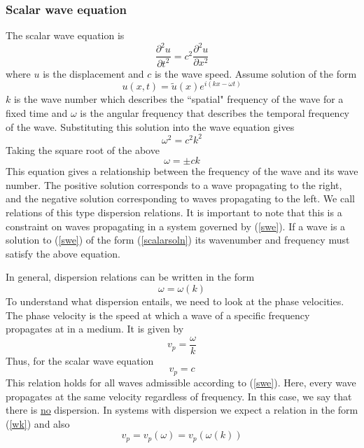 \documentclass{article}
\begin{document}
\subsubsection{Scalar wave equation}
The scalar wave equation is 
\begin{equation} \label{swe}
\frac{\partial^2 u}{\partial t^2} = c^2 \frac{\partial^2 u}{\partial x^2}
\end{equation}
where $u$ is the displacement and $c$ is the wave speed. Assume solution of 
the form
\begin{equation} \label{scalarsoln}
u(x,t) = \tilde{u}(x)e^{i(kx - \omega t)}
\end{equation}
$k$ is the wave number which describes the ``spatial" frequency of 
the wave for a fixed time and $\omega$ is the angular frequency that describes 
the temporal frequency of the wave. Substituting this solution into the wave 
equation gives
\begin{equation}
\omega^2 = c^2 k^2
\end{equation}
Taking the square root of the above
\begin{equation} \label{nd}
\omega = \pm c k
\end{equation}
This equation gives a relationship between the frequency of the wave and its 
wave number. The positive solution corresponds to a wave propagating to the 
right, and the negative solution corresponding to waves propagating to the 
left. We call relations of this type dispersion relations. It is 
important to note that this is a constraint on waves propagating in a system 
governed by (\ref{swe}). If a wave is a solution to (\ref{swe}) of the form 
(\ref{scalarsoln}) its wavenumber and frequency must satisfy the above equation.

In general, dispersion relations can be written in the form
\begin{equation} \label{wk}
\omega = \omega(k)
\end{equation}
To understand what dispersion entails, we need to look at the phase velocities. 
The phase velocity is the speed at which a wave of a specific frequency 
propagates at in a medium. It is given by
\begin{equation}
v_p = \frac{\omega}{k}
\end{equation}
Thus, for the scalar wave equation 
\begin{equation}
v_p = c
\end{equation}
This relation holds for all waves admissible according to (\ref{swe}). Here, 
every wave propagates at the same velocity regardless of frequency. In this 
case, we say that there is \underline{no} dispersion. In systems with 
dispersion we expect a relation in the form (\ref{wk}) and also
\begin{equation}
v_p = v_p(\omega) = v_p(\omega(k))
\end{equation}
\end{document}
